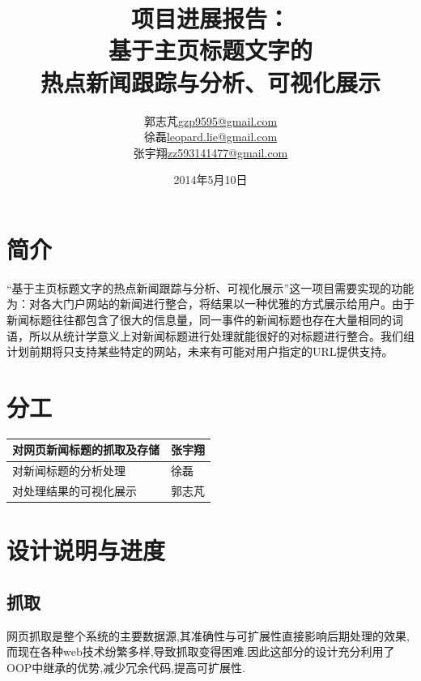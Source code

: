 \documentclass[12pt]{article}
\begin{document}
\title{项目进展报告：\\[3ex] 基于主页标题文字的\\热点新闻跟踪与分析、可视化展示\\[3ex]}

\author{郭志芃\quad\href{mailto:gzp9595@gmail.com}{gzp9595@gmail.com}\\
	徐磊\quad\href{mailto:leopard.lie@gmail.com}{leopard.lie@gmail.com}\\
	张宇翔\quad\href{mailto:zz593141477@gmail.com}{zz593141477@gmail.com}\\[3ex]}
\date{2014年5月10日}
\maketitle
\newpage
\renewcommand{\contentsname}{项目进展报告}
\tableofcontents
\newpage
\section{简介}
“基于主页标题文字的热点新闻跟踪与分析、可视化展示”这一项目需要实现的功能为：对各大门户网站的新闻进行整合，将结果以一种优雅的方式展示给用户。由于新闻标题往往都包含了很大的信息量，同一事件的新闻标题也存在大量相同的词语，所以从统计学意义上对新闻标题进行处理就能很好的对标题进行整合。我们组计划前期将只支持某些特定的网站，未来有可能对用户指定的URL提供支持。
\section{分工}
\begin{center}
\begin{table}[!hbp]
\begin{tabular}{||l|l||}
\hline\hline
对网页新闻标题的抓取及存储 & 张宇翔\\
\hline
对新闻标题的分析处理 & 徐磊\\
\hline
对处理结果的可视化展示 & 郭志芃\\
\hline\hline
\end{tabular}
\end{table}
\end{center}
\section{设计说明与进度}
\subsection{抓取}
网页抓取是整个系统的主要数据源,其准确性与可扩展性直接影响后期处理的效果,而现在各种web技术纷繁多样,导致抓取变得困难.因此这部分的设计充分利用了OOP中继承的优势,减少冗余代码,提高可扩展性.
\end{document}
